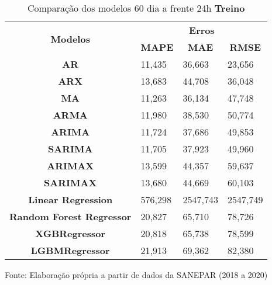 \begin{table}[H]
	\centering
	\caption{Comparação dos modelos 60 dia a frente 24h \textbf{Treino} }\label{tb:60-24trn}
	\begin{tabular}{@{}clll@{}}
		\toprule
		\multirow{2}{*}{\textbf{Modelos}} & \multicolumn{3}{c}{\textbf{Erros}}                                                                       \\ \cmidrule(l){2-4} 
		& \multicolumn{1}{c}{\textbf{MAPE}} & \multicolumn{1}{c}{\textbf{MAE}} & \multicolumn{1}{c}{\textbf{RMSE}} \\ \hline
\textbf{AR}                       & 11,435                            & 36,663                           & 23,656                            \\
\textbf{ARX}                      & 13,683                            & 44,708                           & 36,048                            \\
\textbf{MA}                       & 11,263                            & 36,134                           & 47,748                            \\
\textbf{ARMA}                     & 11,980                            & 38,530                           & 50,774                            \\
\textbf{ARIMA}                    & 11,724                            & 37,686                           & 49,853                            \\
\textbf{SARIMA}                   & 11,705                            & 37,923                           & 49,960                            \\
\textbf{ARIMAX}                   & 13,599                            & 44,357                           & 59,637                            \\
\textbf{SARIMAX}                  & 13,680                            & 44,669                           & 60,103                            \\
\textbf{Linear Regression}        & 576,298                           & 2547,743                         & 2547,749                          \\
\textbf{Random Forest Regressor}  & 20,827                            & 65,710                           & 78,726                            \\
\textbf{XGBRegressor}             & 20,818                            & 65,738                           & 78,599                            \\
\textbf{LGBMRegressor}            & 21,913                            & 69,362                           & 82,380                            \\ \bottomrule
	\end{tabular}

Fonte: Elaboração própria a partir de dados da SANEPAR (2018 a 2020)
\end{table}

